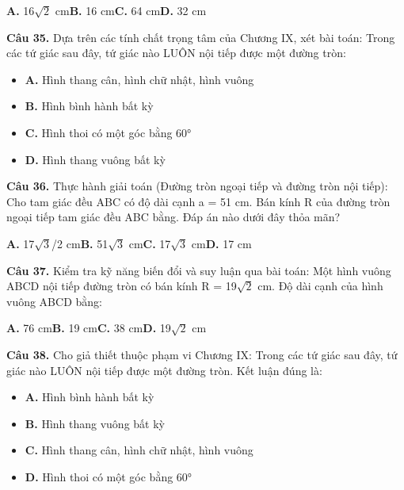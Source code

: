 \documentclass[11pt,a4paper]{article}
\begin{document}
\hspace*{1.5em}\textbf{A.} 16$\sqrt{2}$ cm\quad\quad \textbf{B.} 16 cm\quad\quad \textbf{C.} 64 cm\quad\quad \textbf{D.} 32 cm\par\vspace{2pt}
\textbf{\color{primary} Câu 35.} Dựa trên các tính chất trọng tâm của Chương IX, xét bài toán: Trong các tứ giác sau đây, tứ giác nào LUÔN nội tiếp được một đường tròn:\par
\begin{itemize}\setlength{\itemsep}{1pt}\setlength{\parskip}{0pt}
  \item[] \textbf{A.} Hình thang cân, hình chữ nhật, hình vuông
  \item[] \textbf{B.} Hình bình hành bất kỳ
  \item[] \textbf{C.} Hình thoi có một góc bằng 60°
  \item[] \textbf{D.} Hình thang vuông bất kỳ
\end{itemize}\vspace{2pt}
\textbf{\color{primary} Câu 36.} Thực hành giải toán (Đường tròn ngoại tiếp và đường tròn nội tiếp): Cho tam giác đều ABC có độ dài cạnh a = 51 cm. Bán kính R của đường tròn ngoại tiếp tam giác đều ABC bằng. Đáp án nào dưới đây thỏa mãn?\par
\hspace*{1.5em}\textbf{A.} 17$\sqrt{3}$/2 cm\quad\quad \textbf{B.} 51$\sqrt{3}$ cm\quad\quad \textbf{C.} 17$\sqrt{3}$ cm\quad\quad \textbf{D.} 17 cm\par\vspace{2pt}
\textbf{\color{primary} Câu 37.} Kiểm tra kỹ năng biến đổi và suy luận qua bài toán: Một hình vuông ABCD nội tiếp đường tròn có bán kính R = 19$\sqrt{2}$ cm. Độ dài cạnh của hình vuông ABCD bằng:\par
\hspace*{1.5em}\textbf{A.} 76 cm\quad\quad \textbf{B.} 19 cm\quad\quad \textbf{C.} 38 cm\quad\quad \textbf{D.} 19$\sqrt{2}$ cm\par\vspace{2pt}
\textbf{\color{primary} Câu 38.} Cho giả thiết thuộc phạm vi Chương IX: Trong các tứ giác sau đây, tứ giác nào LUÔN nội tiếp được một đường tròn. Kết luận đúng là:\par
\begin{itemize}\setlength{\itemsep}{1pt}\setlength{\parskip}{0pt}
  \item[] \textbf{A.} Hình bình hành bất kỳ
  \item[] \textbf{B.} Hình thang vuông bất kỳ
  \item[] \textbf{C.} Hình thang cân, hình chữ nhật, hình vuông
  \item[] \textbf{D.} Hình thoi có một góc bằng 60°
\end{itemize}\vspace{2pt}
\end{document}
